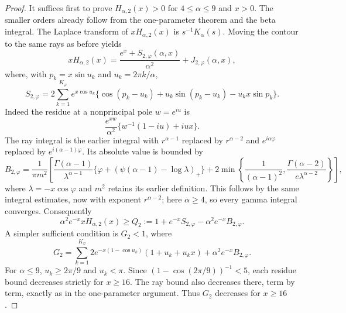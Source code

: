 \documentclass[11pt,a4paper]{article}
\theoremstyle{plain}
\theoremstyle{remark}
\begin{document}
\begin{proof}
It suffices first to prove $H_{\alpha,2}(x)>0$ for
$4\leq\alpha\leq9$ and $x>0$. The smaller orders already follow from
the one-parameter theorem and the beta integral.
The Laplace transform of $xH_{\alpha,2}(x)$ is $s^{-1}K_\alpha(s)$.
Moving the contour to the same rays as before yields
\[
 xH_{\alpha,2}(x)
 =\frac{e^x+S_{2,\varphi}(\alpha,x)}{\alpha^2}
   +J_{2,\varphi}(\alpha,x),
\]
where, with $p_k=x\sin u_k$ and $u_k=2\pi k/\alpha$,
\[
 S_{2,\varphi}
 =2\sum_{k=1}^{K_\varphi} e^{x\cos u_k}
   \{\cos(p_k-u_k)+u_k\sin(p_k-u_k)-u_kx\sin p_k\}.
\]
Indeed the residue at a nonprincipal pole $w=e^{iu}$ is
\[
 \frac{e^{xw}}{\alpha^2}
       \{w^{-1}(1-iu)+iux\}.
\]
The ray integral is the earlier integral with $r^{\alpha-1}$ replaced
by $r^{\alpha-2}$ and $e^{i\alpha\varphi}$ replaced by
$e^{i(\alpha-1)\varphi}$. Its absolute value is bounded by
\[
 B_{2,\varphi}=
 \frac1{\pi m^2}\left[
 \frac{\Gamma(\alpha-1)}{\lambda^{\alpha-1}}
 \{\varphi+(\psi(\alpha-1)-\log\lambda)_+\}
 +2\min\left\{\frac1{(\alpha-1)^2},
       \frac{\Gamma(\alpha-2)}{e\lambda^{\alpha-2}}\right\}\right],
\]
where $\lambda=-x\cos\varphi$ and $m^2$ retains its earlier definition.
This follows by the same integral estimates, now with exponent
$r^{\alpha-2}$; here $\alpha\geq4$, so every gamma integral converges.
Consequently
\[
 \alpha^2e^{-x}xH_{\alpha,2}(x)
 \geq Q_2:=1+e^{-x}S_{2,\varphi}-\alpha^2e^{-x}B_{2,\varphi}.
\]
A simpler sufficient condition is $G_2<1$, where
\[
 G_2=\sum_{k=1}^{K_\varphi}
       2e^{-x(1-\cos u_k)}(1+u_k+u_kx)
          +\alpha^2e^{-x}B_{2,\varphi}.
\]
For $\alpha\leq9$, $u_k\geq2\pi/9$ and $u_k<\pi$.
Since $(1-\cos(2\pi/9))^{-1}<5$, each residue bound decreases
strictly for $x\geq16$. The ray bound also decreases there, term by
term, exactly as in the one-parameter argument. Thus $G_2$ decreases
for $x\geq16$.


\end{proof}
\end{document}
